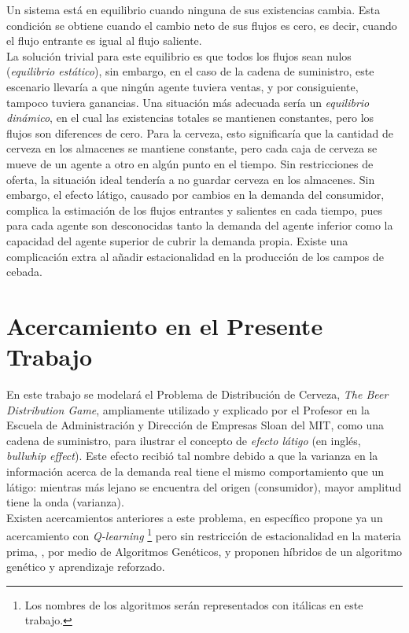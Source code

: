 Un sistema est\'a en equilibrio cuando ninguna de sus existencias cambia. Esta condici\'on se obtiene cuando el cambio neto de sus flujos es cero, es decir, cuando el flujo entrante es igual al flujo saliente. \\

La soluci\'on trivial para este equilibrio es que todos los flujos sean nulos (\textit{equilibrio est\'atico}), sin embargo, en el caso de la cadena de suministro, este escenario llevar\'ia a que ning\'un agente tuviera ventas, y por consiguiente, tampoco tuviera ganancias. Una situaci\'on m\'as adecuada ser\'ia un \textit{equilibrio din\'amico}, en el cual las existencias totales se mantienen constantes, pero los flujos son diferences de cero. Para la cerveza, esto significar\'ia que la cantidad de cerveza en los almacenes se mantiene constante, pero cada caja de cerveza se mueve de un agente a otro en alg\'un punto en el tiempo. Sin restricciones de oferta, la situaci\'on ideal tender\'ia a no guardar cerveza en los almacenes. Sin embargo, el efecto l\'atigo, causado por cambios en la demanda del consumidor, complica la estimaci\'on de los flujos entrantes y salientes en cada tiempo, pues para cada agente son desconocidas tanto la demanda del agente inferior como la capacidad del agente superior de cubrir la demanda propia. Existe una complicaci\'on extra al a\~nadir estacionalidad en la producci\'on de los campos de cebada. \\

\section{Acercamiento en el Presente Trabajo}

En este trabajo se modelará el Problema de Distribución de Cerveza, \textit{The Beer Distribution Game}, ampliamente utilizado y explicado por el Profesor \citet{Sterman} en la Escuela de Administraci\'on y Direcci\'on de Empresas Sloan del MIT, como una cadena de suministro, para ilustrar el concepto de \textit{efecto l\'atigo} (en ingl\'es, \textit{bullwhip effect}). Este efecto recibi\'o tal nombre debido a que la varianza en la informaci\'on acerca de la demanda real tiene el mismo comportamiento que un l\'atigo: mientras m\'as lejano se encuentra del origen (consumidor), mayor amplitud tiene la onda (varianza).\\

Existen acercamientos anteriores a este problema, en espec\'ifico \citet{Chaharsooghi} propone ya un acercamiento con \textit{Q-learning} \footnote{Los nombres de los algoritmos ser\'an representados con it\'alicas en este trabajo.} pero sin restricci\'on de estacionalidad en la materia prima, \citet{Strozzi}, por medio de Algoritmos Genéticos, \citet{Kimbrough} y \citet{Zarandi} proponen h\'ibridos de un algoritmo gen\'etico y aprendizaje reforzado.\\

